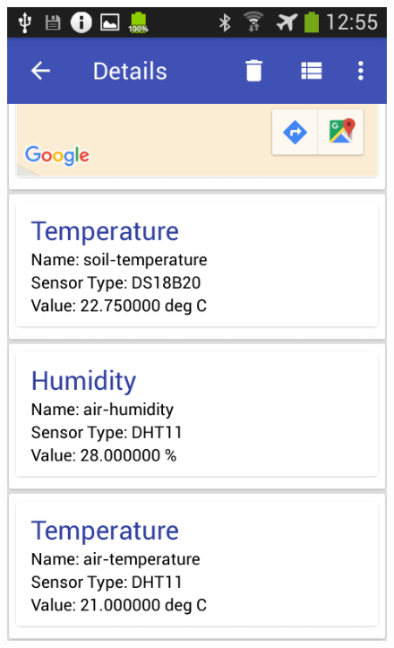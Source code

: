 \begin{figure}[h]
\begin{minipage}{.33\textwidth}
  \includegraphics[width=.95\linewidth]{src/details_2.png}
\end{minipage}
\begin{minipage}{.33\textwidth}
  \centering

\end{minipage}
\end{figure}
